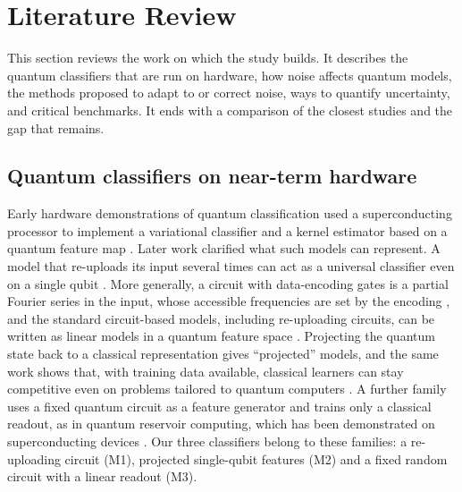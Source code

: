 \section{Literature Review}
\label{sec:litreview}

This section reviews the work on which the study builds. It describes the quantum classifiers
that are run on hardware, how noise affects quantum models, the methods proposed to adapt to
or correct noise, ways to quantify uncertainty, and critical benchmarks. It ends with a
comparison of the closest studies and the gap that remains.

\subsection{Quantum classifiers on near-term hardware}
Early hardware demonstrations of quantum classification used a superconducting processor to
implement a variational classifier and a kernel estimator based on a quantum feature map
\cite{havlicek2019supervised}. Later work clarified what such models can represent. A model
that re-uploads its input several times can act as a universal classifier even on a single
qubit \cite{perezsalinas2020reuploading}. More generally, a circuit with data-encoding gates is
a partial Fourier series in the input, whose accessible frequencies are set by the encoding
\cite{schuld2021encoding}, and the standard circuit-based models, including re-uploading
circuits, can be written as linear models in a quantum feature space
\cite{jerbi2023beyondkernels}. Projecting the quantum state back to a classical representation
gives ``projected'' models, and the same work shows that, with training data available,
classical learners can stay competitive even on problems tailored to quantum computers
\cite{huang2021power}. A further family uses a fixed quantum circuit as a feature generator and
trains only a classical readout, as in quantum reservoir computing, which has been
demonstrated on superconducting devices \cite{yasuda2023qrc}. Our three classifiers belong to
these families: a re-uploading circuit (M1), projected single-qubit features (M2) and a fixed
random circuit with a linear readout (M3).


